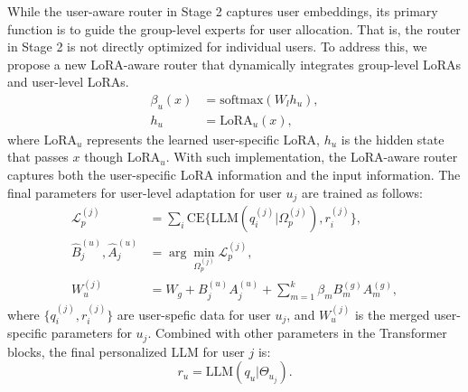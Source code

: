 \documentclass[11pt]{article}
\begin{document}
While the user-aware router in Stage 2 captures user embeddings, its primary function is to guide the group-level experts for user allocation.
That is, the router in Stage 2 is not directly optimized for individual users.  
To address this, we propose a new LoRA-aware router that dynamically integrates group-level LoRAs and user-level LoRAs. 
\begin{equation}
\begin{split}
    \beta_u(x) &= \text{softmax}(W_lh_u), \\
    h_u &= \text{LoRA}_u(x),
\end{split}
\end{equation}
where $\text{LoRA}_u$ represents the learned user-specific LoRA, $h_u$ is the hidden state that passes $x$ though $\text{LoRA}_u$. 
With such implementation, the LoRA-aware router captures both the user-specific LoRA information and the input information.
The final parameters for user-level adaptation for user $u_j$ are trained as follows: 
\begin{equation}
\begin{split}
    \mathcal{L}^{(j)}_p &= \sum_i \text{CE}\{\text{LLM}(q^{(j)}_i|\Omega^{(j)}_p),r^{(j)}_i\}, \\
    \hat{B}_j^{(u)}, \hat{A}_j^{(u)} &= \arg\min_{\Omega^{(j)}_p} \mathcal{L}^{(j)}_p, \\
    W^{(j)}_u &= W_g+B_j^{(u)} A_j^{(u)}+ \sum^k_{m=1} \beta_m B_m^{(g)} A_m^{(g)},
\end{split}
\end{equation}
where $\{q^{(j)}_i,r^{(j)}_i\}$ are user-spefic data for user $u_j$, and $W^{(j)}_u$ is the merged user-specific parameters for $u_j$. 
Combined with other parameters in the Transformer blocks, the final personalized LLM for user $j$ is:
\begin{equation}
    r_u = \text{LLM}(q_u|\Theta_{u_j}).
\end{equation}
\end{document}
